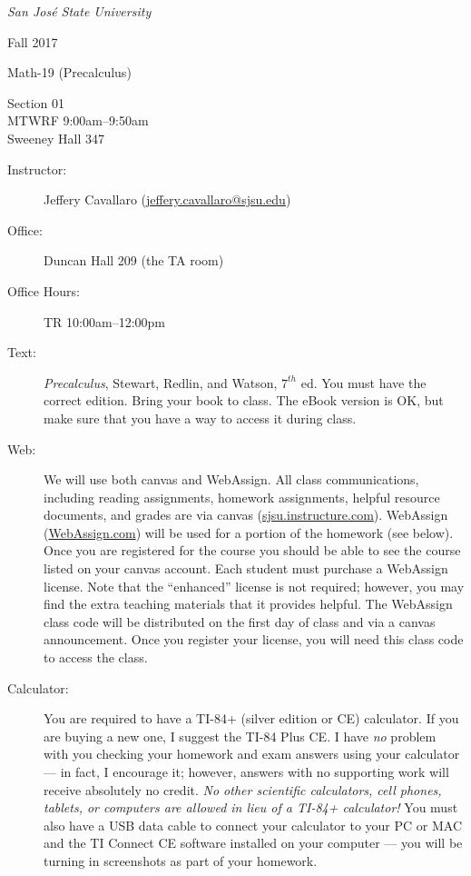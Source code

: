 \documentclass[letterpaper,12pt,fleqn]{article}
\begin{document}
\begin{center}
  \emph{San Jos\'{e} State University}

  Fall 2017

  \Large{Math-19 (Precalculus)}\normalsize

  Section 01 \\
  MTWRF 9:00am--9:50am \\
  Sweeney Hall 347
\end{center}

\vspace{0.5in}

\begin{description}

\item[Instructor:] Jeffery Cavallaro (\url{jeffery.cavallaro@sjsu.edu})

\item[Office:] Duncan Hall 209 (the TA room)

\item[Office Hours:] TR 10:00am--12:00pm

\item[Text:] \emph{Precalculus}, Stewart, Redlin, and Watson, $7^{th}$ ed. You
  must have the correct edition. Bring your book to class. The eBook version
  is OK, but make sure that you have a way to access it during class.

\item[Web:] We will use both canvas and WebAssign. All class communications,
  including reading assignments, homework assignments, helpful resource
  documents, and grades are via canvas (\url{sjsu.instructure.com}). WebAssign
  (\url{WebAssign.com}) will be used for a portion of the homework (see below).
  Once you are registered for the course you should be able to see the course
  listed on your canvas account. Each student must purchase a Web\-Assign
  license. Note that the ``enhanced'' license is not required; however, you
  may find the extra teaching materials that it provides helpful. The
  WebAssign class code will be distributed on the first day of class and via
  a canvas announcement. Once you register your license, you will need this
  class code to access the class.

\item[Calculator:] You are required to have a TI-84+ (silver edition or CE) calculator.
  If you are buying a new one, I suggest the TI-84 Plus CE. I have \emph{no}
  problem with you checking your homework and exam answers using your calculator --- in
  fact, I encourage it; however, answers with no supporting work will receive absolutely
  no credit. \emph{No other scientific calculators, cell phones, tablets, or computers
    are allowed in lieu of a TI-84+ calculator!} You must also have a USB data cable
  to connect your calculator to your PC or MAC and the TI Connect CE software installed
  on your computer --- you will be turning in screenshots as part of your homework.


\end{description}
\end{document}
